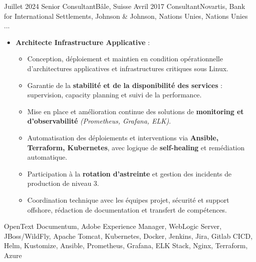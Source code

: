 %
%
%

\begin{experiences}

\consultantexperience
    {Juillet 2024} {Senior Consultant}{}{Bâle, Suisse}
    {Avril 2017}    {Consultant}{Novartis, Bank for International Settlements, Johnson \& Johnson, Nations Unies, Nations Unies ...} {
        \begin{itemize}[left=0pt,label={},itemsep=0.5em]
          \vspace{0.3em}
          \item \textbf{Architecte Infrastructure Applicative} :
            \begin{itemize}[itemsep=0.2em,topsep=0.2em,parsep=0pt]
              \small
              \item Conception, déploiement et maintien en condition opérationnelle d’architectures applicatives et infrastructures critiques sous Linux.
              \item Garantie de la \textbf{stabilité et de la disponibilité des services} : supervision, capacity planning et suivi de la performance.
              \item Mise en place et amélioration continue des solutions de \textbf{monitoring et d’observabilité} \emph{(Prometheus, Grafana, ELK)}.
              \item Automatisation des déploiements et interventions via \textbf{Ansible, Terraform, Kubernetes}, avec logique de \textbf{self-healing} et remédiation automatique.
              \item Participation à la \textbf{rotation d’astreinte} et gestion des incidents de production de niveau 3.
              \item Coordination technique avec les équipes projet, sécurité et support offshore, rédaction de documentation et transfert de compétences.
            \end{itemize}
          \vspace{0.3em}

        \end{itemize} %
    }
    {OpenText Documentum, Adobe Experience Manager, WebLogic Server, JBoss/WildFly, Apache Tomcat, Kubernetes, Docker, Jenkins, Jira, Gitlab CICD, Helm, Kustomize, Ansible, Prometheus, Grafana, ELK Stack, Nginx, Terraform, Azure}
    


\end{experiences}
